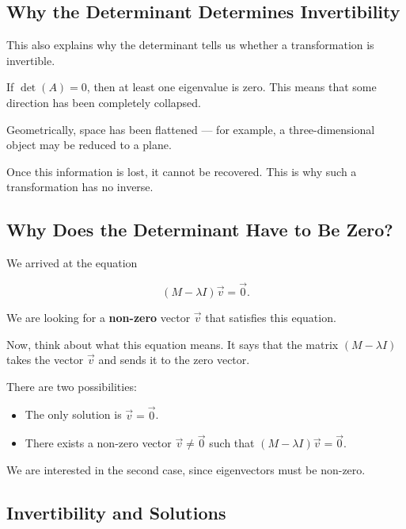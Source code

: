 \documentclass[11pt,openany]{book}
\theoremstyle{definition}
\begin{document}
\subsection{Why the Determinant Determines Invertibility}

This also explains why the determinant tells us whether a transformation is invertible.

\medskip

If $\det(A) = 0$, then at least one eigenvalue is zero. This means that some direction
has been completely collapsed.

\medskip

Geometrically, space has been flattened — for example, a three-dimensional object may be
reduced to a plane.

\medskip

Once this information is lost, it cannot be recovered. This is why such a transformation
has no inverse.

\subsection{Why Does the Determinant Have to Be Zero?}

We arrived at the equation

\[
(M - \lambda I)\vec{v} = \vec{0}.
\]

We are looking for a \textbf{non-zero} vector $\vec{v}$ that satisfies this equation.

\medskip

Now, think about what this equation means. It says that the matrix $(M - \lambda I)$
takes the vector $\vec{v}$ and sends it to the zero vector.

\medskip

There are two possibilities:

\begin{itemize}
  \item The only solution is $\vec{v} = \vec{0}$.
  \item There exists a non-zero vector $\vec{v} \neq \vec{0}$ such that $(M - \lambda I)\vec{v} = \vec{0}$.
\end{itemize}

\medskip

We are interested in the second case, since eigenvectors must be non-zero.

\medskip

\subsection{Invertibility and Solutions}
\end{document}
